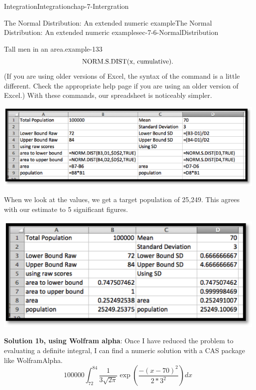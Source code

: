 \documentclass[oneside,10pt,]{book}
\newcommand{\terminology}[1]{\textbf{#1}}
\numberwithin{equation}{section}
\begin{document}
\begin{chapterptx}{Integration}{}{Integration}{}{}{chap-7-Intergration}
\begin{sectionptx}{The Normal Distribution: An extended numeric example}{}{The Normal Distribution: An extended numeric example}{}{}{sec-7-6-NormalDistribution}
\begin{example}{Tall men in an area.}{example-133}
\begin{equation*}
\hbox{NORM.S.DIST(x, cumulative).}
\end{equation*}
\hypertarget{p-2948}{}%
(If you are using older versions of Excel, the syntax of the command is a little different.  Check the appropriate help page if you are using an older version of Excel.)  With these commands, our spreadsheet is noticeably simpler.%
\begin{sidebyside}{1}{0.15}{0.15}{0}%
\begin{sbspanel}{0.7}%
\includegraphics[width=1\linewidth]{images/sec7-6-4.png}
\end{sbspanel}%
\end{sidebyside}%
\par
\hypertarget{p-2949}{}%
When we look at the values, we get a target population of 25,249.  This agrees with our estimate to 5 significant figures.%
\begin{sidebyside}{1}{0.25}{0.25}{0}%
\begin{sbspanel}{0.5}%
\includegraphics[width=1\linewidth]{images/sec7-6-5.png}
\end{sbspanel}%
\end{sidebyside}%
\par
\hypertarget{p-2950}{}%
\terminology{Solution 1b, using Wolfram alpha}:  Once I have reduced the problem to evaluating a definite integral, I can find a numeric solution with a CAS package like Wolfram\textbar{}Alpha.%
%
\begin{equation*}
100000\int_{72}^{84} \frac{1}{3\sqrt{2\pi}} \exp\left(\frac{-(x-70)^2}{2*3^2 }\right)dx
\end{equation*}

\end{example}
\end{sectionptx}
\end{chapterptx}
\end{document}
